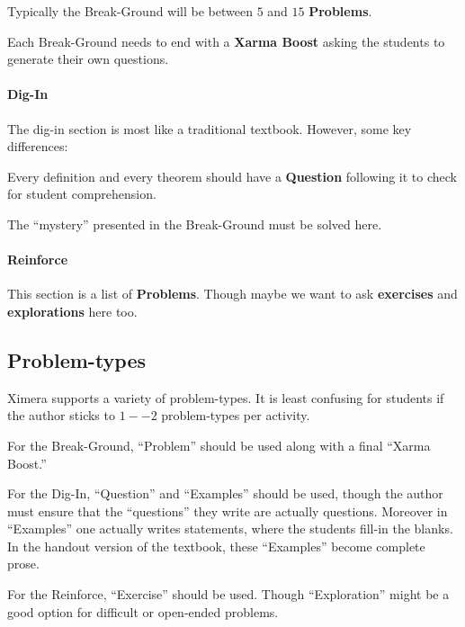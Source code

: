 \documentclass{article}
\begin{document}
Typically the Break-Ground will be between $5$ and $15$ \textbf{Problems}.

Each Break-Ground needs to end with a \textbf{Xarma Boost} asking the
students to generate their own questions.


\paragraph{Dig-In}


The dig-in section is most like a traditional textbook. However, some key differences:


Every definition and every theorem should have a \textbf{Question}
following it to check for student comprehension.


The ``mystery'' presented in the Break-Ground must be solved here. 



\paragraph{Reinforce}

This section is a list of \textbf{Problems}. Though maybe we want to
ask \textbf{exercises} and \textbf{explorations} here too.



\subsection*{Problem-types}

Ximera supports a variety of problem-types. It is least confusing for
students if the author sticks to $1--2$ problem-types per activity.



For the Break-Ground, ``Problem'' should be used along with a final ``Xarma
Boost.''



For the Dig-In, ``Question'' and ``Examples'' should be used, though
the author must ensure that the ``questions'' they write are actually
questions. Moreover in ``Examples'' one actually writes statements,
where the students fill-in the blanks. In the handout version of the
textbook, these ``Examples'' become complete prose. 



For the Reinforce, ``Exercise'' should be used. Though ``Exploration''
might be a good option for difficult or open-ended problems.
\end{document}
